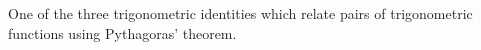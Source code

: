 One of the three trigonometric identities which relate pairs of 
trigonometric functions using Pythagoras' theorem.
